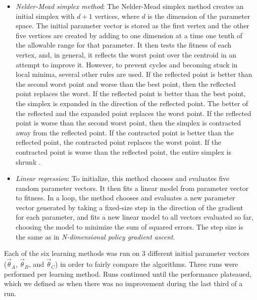 \begin{itemize}
\item \emph{Nelder-Mead simplex method}: The Nelder-Mead simplex
  method \cite{nm} creates an initial simplex with $d+1$ vertices,
  where $d$ is the dimension of the parameter space. The initial
  parameter vector is stored as the first vertex and the other five
  vertices are created by adding to one dimension at a time one tenth
  of the allowable range for that parameter. It then tests the fitness
  of each vertex, and, in general, it reflects the worst point over
  the centroid in an attempt to improve it.  However, to prevent
  cycles and becoming stuck in local minima, several other rules are
  used.  If the reflected point is better than the second worst point
  and worse than the best point, then the reflected point replaces the
  worst. If the reflected point is better than the best point, the
  simplex is expanded in the direction of the reflected point. The
  better of the reflected and the expanded point replaces the worst
  point. If the reflected point is worse than the second worst point,
  then the simplex is contracted away from the reflected point. If the
  contracted point is better than the reflected point, the contracted
  point replaces the worst point. If the contracted point is worse
  than the reflected point, the entire simplex is shrunk \cite{nm}.

\item \emph{Linear regression}: To initialize, this method chooses and
  evaluates five random parameter vectors. It then fits a linear model
  from parameter vector to fitness. In a loop, the method chooses and
  evaluates a new parameter vector generated by taking a fixed-size
  step in the direction of the gradient for each parameter, and fits a
  new linear model to all vectors evaluated so far, choosing the model
  to minimize the sum of squared errors. The step size is the same as in
  \emph{N-dimensional policy gradient ascent}.


\end{itemize}

Each of the six learning methods was run on 3 different initial
parameter vectors ($\vec{\theta}_A$,
$\vec{\theta}_B$, and $\vec{\theta}_C$) in order to fairly compare the algorithms. Three runs were performed per learning method. Runs continued until the performance plateaued, which we defined as when there was no improvement during the last third of
a run.

